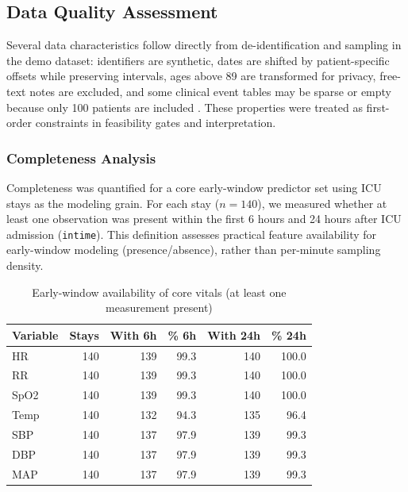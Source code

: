 \documentclass[12pt]{article}
\begin{document}
\subsection{Data Quality Assessment}
\label{subsec:data_quality}

Several data characteristics follow directly from de-identification and sampling in the demo dataset: identifiers are synthetic, dates are shifted by patient-specific offsets while preserving intervals, ages above 89 are transformed for privacy, free-text notes are excluded, and some clinical event tables may be sparse or empty because only 100 patients are included \cite{PhysioNet-mimic-iv-demo-2.2}. These properties were treated as first-order constraints in feasibility gates and interpretation.

\subsubsection*{Completeness Analysis}
Completeness was quantified for a core early-window predictor set using ICU stays as the modeling grain. For each stay (\(n=140\)), we measured whether at least one observation was present within the first 6 hours and 24 hours after ICU admission (\texttt{intime}). This definition assesses practical feature availability for early-window modeling (presence/absence), rather than per-minute sampling density.

\begin{table}[H]
\centering
\caption{Early-window availability of core vitals (at least one measurement present)}
\label{tab:missingness_vitals}
\begin{tabular}{l r r r r r}
\toprule
\textbf{Variable} & \textbf{Stays} & \textbf{With 6h} & \textbf{\% 6h} & \textbf{With 24h} & \textbf{\% 24h} \\
\midrule
HR   & 140 & 139 & 99.3 & 140 & 100.0 \\
RR   & 140 & 139 & 99.3 & 140 & 100.0 \\
SpO2 & 140 & 139 & 99.3 & 140 & 100.0 \\
Temp & 140 & 132 & 94.3 & 135 & 96.4 \\
SBP  & 140 & 137 & 97.9 & 139 & 99.3 \\
DBP  & 140 & 137 & 97.9 & 139 & 99.3 \\
MAP  & 140 & 137 & 97.9 & 139 & 99.3 \\
\bottomrule
\end{tabular}
\end{table}
\end{document}
